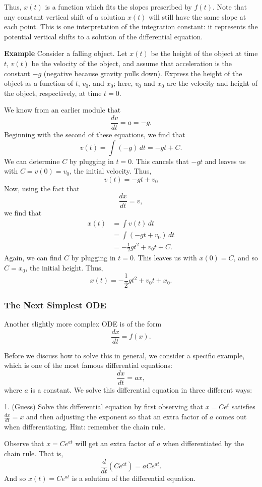 \documentclass[twoside,openright,titlepage,a4paper]{book}
\begin{document}
\begin{sloppypar}
Thus, $x(t)$ is a function which fits the slopes prescribed by $f(t)$. Note that any constant vertical shift of a solution $x(t)$ will still have the same slope at each point. This is one interpretation of the integration constant: it represents the potential vertical shifts to a solution of the differential equation.

\textbf{Example} Consider a falling object. Let $x(t)$ be the height of the object at time $t$, $v(t)$ be the velocity of the object, and assume that acceleration is the constant $-g$ (negative because gravity pulls down). Express the height of the object as a function of $t$, $v_0$, and $x_0$; here, $v_0$ and $x_0$ are the velocity and height of the object, respectively, at time $t=0$.
\begin{examplebox}
We know from an earlier module that \[ \frac{dv}{dt} = a = -g. \]
Beginning with the second of these equations, we find that \[ v(t) = \int (-g) \, dt = -gt + C. \]
We can determine $C$ by plugging in $t=0$. This cancels that $-gt$ and leaves us with $C = v(0) = v_0$, the initial velocity. Thus, \[ v(t) = -gt + v_0 \]
Now, using the fact that \[ \frac{dx}{dt} = v, \]
we find that
\begin{align*}
x(t) &= \int v(t) \, dt \\
&= \int (-gt + v_0) \, dt \\
&= -\frac{1}{2}gt^2 + v_0t + C.
\end{align*}
Again, we can find $C$ by plugging in $t=0$. This leaves us with $x(0) = C$, and so $C=x_0$, the initial height. Thus, \[ x(t) = -\frac{1}{2}gt^2 + v_0t + x_0. \]
\end{examplebox}	

\subsubsection{The Next Simplest ODE}

Another slightly more complex ODE is of the form \[ \frac{dx}{dt} = f(x). \]

Before we discuss how to solve this in general, we consider a specific example, which is one of the most famous differential equations: \[ \frac{dx}{dt} = ax, \] where $a$ is a constant. We solve this differential equation in three different ways:

1. (Guess) Solve this differential equation by first observing that $x = Ce^t$ satisfies $\frac{dx}{dt} = x$ and then adjusting the exponent so that an extra factor of $a$ comes out when differentiating. Hint: remember the chain rule.
\begin{examplebox}
Observe that $x = Ce^{at}$ will get an extra factor of $a$ when differentiated by the chain rule. That is, \[ \frac{d}{dt} \left(Ce^{at}\right) = a Ce^{at}. \] And so $x(t) = Ce^{at}$ is a solution of the differential equation.	
\end{examplebox}


\end{sloppypar}
\end{document}
